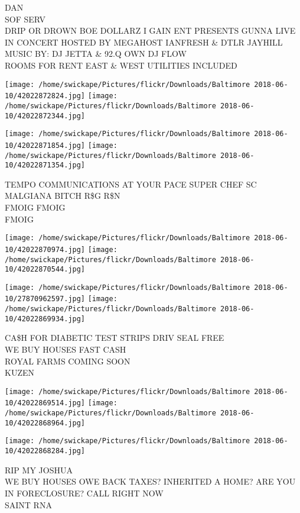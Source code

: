 \documentclass[10pt,letterpaper]{article}
\begin{document}
DAN\\
SOF SERV\\
DRIP OR DROWN BOE DOLLARZ I GAIN ENT PRESENTS GUNNA LIVE IN CONCERT HOSTED BY MEGAHOST IANFRESH \& DTLR JAYHILL MUSIC BY: DJ JETTA \& 92.Q OWN DJ FLOW\\
ROOMS FOR RENT EAST \& WEST UTILITIES INCLUDED\\
\pagebreak

\texttt{[image: /home/swickape/Pictures/flickr/Downloads/Baltimore 2018-06-10/42022872824.jpg]}
\texttt{[image: /home/swickape/Pictures/flickr/Downloads/Baltimore 2018-06-10/42022872344.jpg]}

\texttt{[image: /home/swickape/Pictures/flickr/Downloads/Baltimore 2018-06-10/42022871854.jpg]}
\texttt{[image: /home/swickape/Pictures/flickr/Downloads/Baltimore 2018-06-10/42022871354.jpg]}

TEMPO COMMUNICATIONS AT YOUR PACE SUPER CHEF SC\\
MALGIANA BITCH R\$G R\$N\\
FMOIG FMOIG\\
FMOIG\\
\pagebreak

\texttt{[image: /home/swickape/Pictures/flickr/Downloads/Baltimore 2018-06-10/42022870974.jpg]}
\texttt{[image: /home/swickape/Pictures/flickr/Downloads/Baltimore 2018-06-10/42022870544.jpg]}

\texttt{[image: /home/swickape/Pictures/flickr/Downloads/Baltimore 2018-06-10/27870962597.jpg]}
\texttt{[image: /home/swickape/Pictures/flickr/Downloads/Baltimore 2018-06-10/42022869934.jpg]}

CA\$H FOR DIABETIC TEST STRIPS DRIV SEAL FREE\\
WE BUY HOUSES FAST CASH\\
ROYAL FARMS COMING SOON\\
KUZEN\\
\pagebreak

\texttt{[image: /home/swickape/Pictures/flickr/Downloads/Baltimore 2018-06-10/42022869514.jpg]}
\texttt{[image: /home/swickape/Pictures/flickr/Downloads/Baltimore 2018-06-10/42022868964.jpg]}

\texttt{[image: /home/swickape/Pictures/flickr/Downloads/Baltimore 2018-06-10/42022868284.jpg]}

RIP MY JOSHUA\\
WE BUY HOUSES OWE BACK TAXES?  INHERITED A HOME?  ARE YOU IN FORECLOSURE?  CALL RIGHT NOW\\
SAINT RNA\\
\pagebreak
\end{document}
